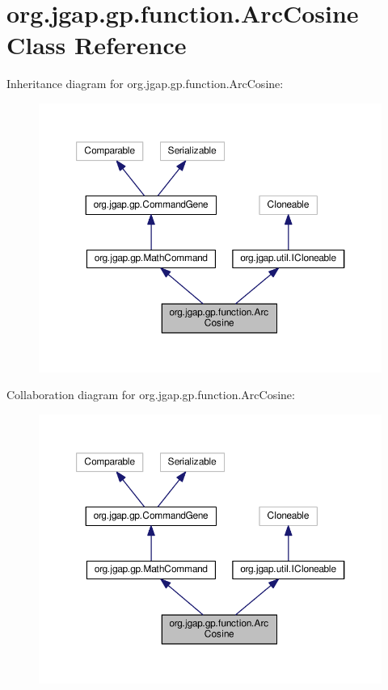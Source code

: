 \hypertarget{classorg_1_1jgap_1_1gp_1_1function_1_1_arc_cosine}{\section{org.\-jgap.\-gp.\-function.\-Arc\-Cosine Class Reference}
\label{classorg_1_1jgap_1_1gp_1_1function_1_1_arc_cosine}
}


Inheritance diagram for org.\-jgap.\-gp.\-function.\-Arc\-Cosine\-:
\nopagebreak
\begin{figure}[H]
\begin{center}
\leavevmode
\includegraphics[width=350pt]{classorg_1_1jgap_1_1gp_1_1function_1_1_arc_cosine__inherit__graph}
\end{center}
\end{figure}


Collaboration diagram for org.\-jgap.\-gp.\-function.\-Arc\-Cosine\-:
\nopagebreak
\begin{figure}[H]
\begin{center}
\leavevmode
\includegraphics[width=350pt]{classorg_1_1jgap_1_1gp_1_1function_1_1_arc_cosine__coll__graph}
\end{center}
\end{figure}
